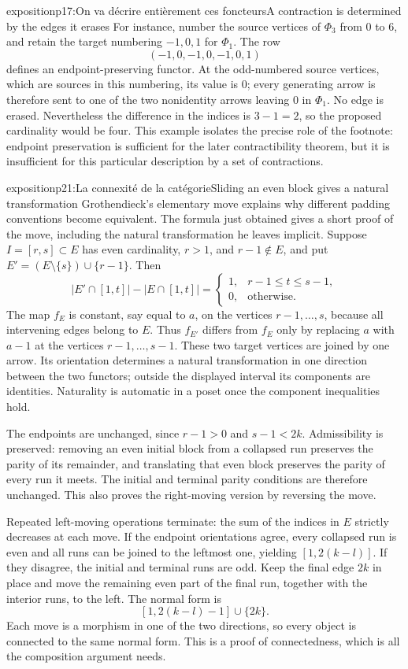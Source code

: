 \begin{dcomment}{exposition}{p17:On va décrire entièrement ces foncteurs}{A contraction is determined by the edges it erases}
For instance, number the source vertices of $\Phi_3$ from $0$ to $6$, and retain the target numbering $-1,0,1$ for $\Phi_1$. The row
\[
 (-1,0,-1,0,-1,0,1)
\]
defines an endpoint-preserving functor. At the odd-numbered source vertices, which are sources in this numbering, its value is $0$; every generating arrow is therefore sent to one of the two nonidentity arrows leaving $0$ in $\Phi_1$. No edge is erased. Nevertheless the difference in the indices is $3-1=2$, so the proposed cardinality would be four. This example isolates the precise role of the footnote: endpoint preservation is sufficient for the later contractibility theorem, but it is insufficient for this particular description by a set of contractions.
\end{dcomment}

\begin{dcomment}{exposition}{p21:La connexité de la catégorie}{Sliding an even block gives a natural transformation}
Grothendieck's elementary move explains why different padding conventions become equivalent. The formula just obtained gives a short proof of the move, including the natural transformation he leaves implicit. Suppose $I=[r,s]\subset E$ has even cardinality, $r>1$, and $r-1\notin E$, and put $E'=(E\setminus\{s\})\cup\{r-1\}$. Then
\[
 |E'\cap[1,t]|-|E\cap[1,t]|=
 \begin{cases}1,&r-1\leq t\leq s-1,\\0,&\text{otherwise}.
 \end{cases}
\]
The map $f_E$ is constant, say equal to $a$, on the vertices $r-1,\ldots,s$, because all intervening edges belong to $E$. Thus $f_{E'}$ differs from $f_E$ only by replacing $a$ with $a-1$ at the vertices $r-1,\ldots,s-1$. These two target vertices are joined by one arrow. Its orientation determines a natural transformation in one direction between the two functors; outside the displayed interval its components are identities. Naturality is automatic in a poset once the component inequalities hold.

The endpoints are unchanged, since $r-1>0$ and $s-1<2k$. Admissibility is preserved: removing an even initial block from a collapsed run preserves the parity of its remainder, and translating that even block preserves the parity of every run it meets. The initial and terminal parity conditions are therefore unchanged. This also proves the right-moving version by reversing the move.

Repeated left-moving operations terminate: the sum of the indices in $E$ strictly decreases at each move. If the endpoint orientations agree, every collapsed run is even and all runs can be joined to the leftmost one, yielding $[1,2(k-l)]$. If they disagree, the initial and terminal runs are odd. Keep the final edge $2k$ in place and move the remaining even part of the final run, together with the interior runs, to the left. The normal form is
\[
 [1,2(k-l)-1]\cup\{2k\}.
\]
Each move is a morphism in one of the two directions, so every object is connected to the same normal form. This is a proof of connectedness, which is all the composition argument needs.


\end{dcomment}
